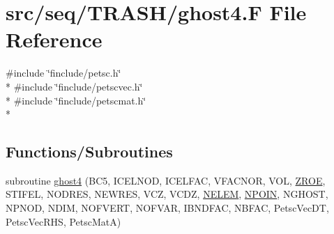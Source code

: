\hypertarget{ghost4_8_f}{\section{src/seq/\-T\-R\-A\-S\-H/ghost4.F File Reference}
\label{ghost4_8_f}
}
{\ttfamily \#include \char`\"{}finclude/petsc.\-h\char`\"{}}\\*
{\ttfamily \#include \char`\"{}finclude/petscvec.\-h\char`\"{}}\\*
{\ttfamily \#include \char`\"{}finclude/petscmat.\-h\char`\"{}}\\*
\subsection*{Functions/\-Subroutines}
\begin{DoxyCompactItemize}
\item 
subroutine \hyperlink{ghost4_8_f_ab983905e57079411c9a9ba18d025583c}{ghost4} (B\-C5, I\-C\-E\-L\-N\-O\-D, I\-C\-E\-L\-F\-A\-C, V\-F\-A\-C\-N\-O\-R, V\-O\-L, \hyperlink{myts_8com_a0c4fbcdb78e6b50c8919d714e4b5a694}{Z\-R\-O\-E}, S\-T\-I\-F\-E\-L, N\-O\-D\-R\-E\-S, N\-E\-W\-R\-E\-S, V\-C\-Z, V\-C\-D\-Z, \hyperlink{mesh_8com_aee5e75b79d0e815c0603cfbccc618957}{N\-E\-L\-E\-M}, \hyperlink{mesh_8com_ae28c1572321efcd8715b974d87d20c58}{N\-P\-O\-I\-N}, N\-G\-H\-O\-S\-T, N\-P\-N\-O\-D, N\-D\-I\-M, N\-O\-F\-V\-E\-R\-T, N\-O\-F\-V\-A\-R, I\-B\-N\-D\-F\-A\-C, N\-B\-F\-A\-C, Petsc\-Vec\-D\-T, Petsc\-Vec\-R\-H\-S, Petsc\-Mat\-A)
\end{DoxyCompactItemize}


